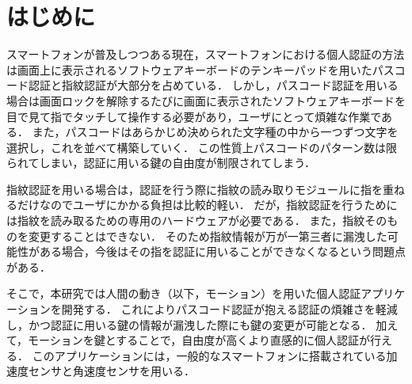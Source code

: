 \section{はじめに}
スマートフォンが普及しつつある現在，スマートフォンにおける個人認証の方法は画面上に表示されるソフトウェアキーボードのテンキーパッドを用いたパスコード認証と指紋認証が大部分を占めている．
しかし，パスコード認証を用いる場合は画面ロックを解除するたびに画面に表示されたソフトウェアキーボードを目で見て指でタッチして操作する必要があり，ユーザにとって煩雑な作業である．
また，パスコードはあらかじめ決められた文字種の中から一つずつ文字を選択し，これを並べて構築していく．
この性質上パスコードのパターン数は限られてしまい，認証に用いる鍵の自由度が制限されてしまう．

指紋認証を用いる場合は，認証を行う際に指紋の読み取りモジュールに指を重ねるだけなのでユーザにかかる負担は比較的軽い．
だが，指紋認証を行うためには指紋を読み取るための専用のハードウェアが必要である．
また，指紋そのものを変更することはできない．
そのため指紋情報が万が一第三者に漏洩した可能性がある場合，今後はその指を認証に用いることができなくなるという問題点がある．

そこで，本研究では人間の動き（以下，モーション）を用いた個人認証アプリケーションを開発する．
これによりパスコード認証が抱える認証の煩雑さを軽減し，かつ認証に用いる鍵の情報が漏洩した際にも鍵の変更が可能となる．
加えて，モーションを鍵とすることで，自由度が高くより直感的に個人認証が行える．
このアプリケーションには，一般的なスマートフォンに搭載されている加速度センサと角速度センサを用いる．

